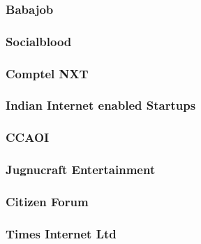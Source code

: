 \documentclass{article}
\begin{document}
\subsubsection{Babajob}


\subsubsection{Socialblood}


% 

\subsubsection{Comptel NXT}


\subsubsection{Indian Internet enabled Startups}


\subsubsection{CCAOI}


\subsubsection{Jugnucraft Entertainment}


\subsubsection{Citizen Forum}


\subsubsection{Times Internet Ltd}

\end{document}
